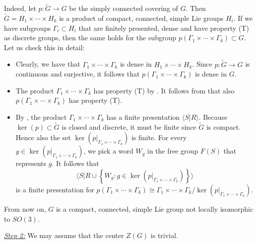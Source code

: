 \documentclass[11pt, letterpaper, oneside,reqno]{amsart}
\theoremstyle{plain}
\theoremstyle{underline}
\theoremstyle{definition}
\theoremstyle{remark}
\begin{document}
	Indeed, let $p:\widetilde{G}\rightarrow G$ be the simply connected covering of $G$. Then $\widetilde{G}=H_1\times\cdots\times H_k$ is a product of compact, connected, simple Lie groups $H_i$. If we have subgroups $\Gamma_i\subset H_i$ that are finitely presented, dense and have property (T) as discrete groups, then the same holds for the subgroup $p\left(\Gamma_1\times\cdots\times\Gamma_k\right)\subset G$. Let us check this in detail:
	\begin{itemize}
		\item Clearly, we have that $\Gamma_1\times\cdots\times\Gamma_k$ is dense in $H_1\times\cdots\times H_k$. Since $p:\widetilde{G}\rightarrow G$ is continuous and surjective, it follows that $p\left(\Gamma_1\times\cdots\times\Gamma_k\right)$ is dense in $G$.
		\item The product $\Gamma_1\times\cdots\times\Gamma_k$ has property (T) by \cite[Prop.~1.7.8]{Kazhdan}. It follows from \cite[Thm.~1.3.4]{Kazhdan} that also $p\left(\Gamma_1\times\cdots\times\Gamma_k\right)$ has property (T).
		\item By \cite[Chapter~4, Prop.~4]{groups}, the product $\Gamma_1\times\cdots\times\Gamma_k$ has a finite presentation $\langle S | R\rangle$. Because $\ker(p)\subset\widetilde{G}$ is closed and discrete, it must be finite since $\widetilde{G}$ is compact. Hence also the set $\ker\left(p|_{\Gamma_1\times\cdots\times\Gamma_k}\right)$ is finite. For every $g\in\ker\left(p|_{\Gamma_1\times\cdots\times\Gamma_k}\right)$, we pick a word $W_g$ in the free group $F(S)$ that represents $g$. It follows that
		\[
		\big\langle S| R\cup\left\{W_g:g\in\ker\left(p|_{\Gamma_1\times\cdots\times\Gamma_k}\right)\right\}\big\rangle
		\]
		is a finite presentation for $p\left(\Gamma_1\times\cdots\times\Gamma_k\right)\cong \Gamma_1\times\cdots\times\Gamma_k/\ker\left(p|_{\Gamma_1\times\cdots\times\Gamma_k}\right)$.
	\end{itemize}
	From now on, $G$ is a compact, connected, simple Lie group not locally isomorphic to $SO(3)$.
	
	\vspace{0.2cm}
	\underline{\emph{Step 2:}} We may assume that the center $Z(G)$ is trivial.
	
\end{document}
